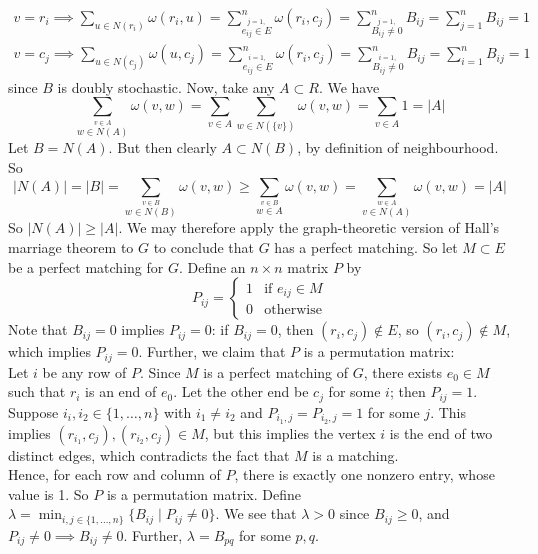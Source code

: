 \documentclass[12pt]{article}
\begin{document}
\[ \begin{array}{c} {\displaystyle
v=r_i \implies \sum_{u \in N(r_i)} \omega(r_i,u)=\sum_{\stackrel{j=1,}{e_{ij} \in E}}^n \omega(r_i,c_j) = \sum_{\stackrel{j=1,}{B_{ij} \neq 0}}^n B_{ij}=
\sum_{j=1}^n B_{ij}=1 } \\
{\displaystyle v=c_j \implies \sum_{u \in N(c_j)} \omega(u,c_j)=\sum_{\stackrel{i=1,}{e_{ij} \in E}}^n \omega(r_i,c_j) = \sum_{\stackrel{i=1,}{B_{ij} \neq 0}}^n B_{ij}=
\sum_{i=1}^n B_{ij}=1 }
\end{array} \]
since $B$ is doubly stochastic.  Now, take any $A \subset R$.  We have
\[ \sum_{\stackrel{v \in A}{w \in N(A)}} \omega(v,w)
   = \sum_{v \in A} \sum_{w \in N(\{v\})} \omega(v,w)
   = \sum_{v \in A} 1 = |A| \]
Let $B=N(A)$.  But then clearly $A \subset N(B)$, by definition of neighbourhood.  So
\[ |N(A)|=|B| = \sum_{\stackrel{v \in B}{w \in N(B)}} \omega(v,w)
      \geq \sum_{\stackrel{v \in B}{w \in A}}  \omega(v,w)
       = \sum_{\stackrel{w \in A}{v \in N(A)}} \omega(v,w) = |A| \]
So $|N(A)| \geq |A|$.  We may therefore apply the graph-theoretic version of Hall's marriage theorem to $G$ to conclude that $G$ has a perfect matching.
%
So let $M \subset E$ be a perfect matching for $G$.  Define an $n \times n$ matrix $P$ by
\[ P_{ij} = \left\{ \begin{array}{ll} 1 & \text{if } e_{ij} \in M \\ 0 & \text{otherwise} \end{array} \right.\]
%
Note that $B_{ij}=0$ implies $P_{ij}=0$: if $B_{ij}=0$, then
$(r_i,c_j) \not \in E$, so $(r_i,c_j) \not \in M$, which implies $P_{ij}=0$.
%
Further, we claim that $P$ is a permutation matrix:\\
Let $i$ be any row of $P$.  Since $M$ is a perfect matching of $G$, there exists $e_0 \in M$ such that $r_i$ is an end of $e_0$.  Let the other end be $c_j$ for some $i$; then $P_{ij}=1$.\\
Suppose $i_i,i_2 \in \{1,\ldots,n\}$ with $i_1 \neq i_2$ and $P_{i_1,j}=P_{i_2,j}=1$ for some $j$.  This implies $(r_{i_1},c_j),(r_{i_2},c_j) \in M$, but this implies the vertex $i$ is the end of two distinct edges, which contradicts the fact that $M$ is a matching.\\
Hence, for each row and column of $P$, there is exactly one nonzero entry, whose value is 1.  So $P$ is a permutation matrix.
%
Define $\displaystyle{\lambda=\min_{i,j \in \{1,\ldots,n\}} \{ B_{ij} \mid P_{ij} \neq 0\}}$.  We see that $\lambda>0$ since $B_{ij} \geq 0$, and $P_{ij} \neq 0 \implies B_{ij} \neq 0$.  Further, $\lambda=B_{pq}$ for some $p,q$.
\end{document}

